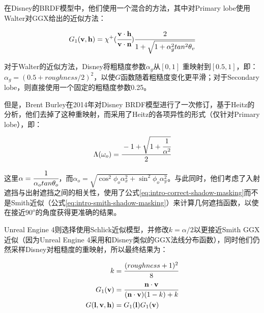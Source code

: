 在Disney的BRDF模型中，他们使用一个混合的方法，其中对Primary lobe使用Walter\cite{a:Microfacetmodelsforrefractionthroughroughsurfaces}对GGX给出的近似方法：

\begin{equation}
	G_1(\mathbf{v},\mathbf{h})=\chi^{+}( \cfrac{\mathbf{v}\cdot\mathbf{h}}{\mathbf{v}\cdot\mathbf{n}})   \cfrac{2}{1+\sqrt{1+\alpha^2_g tan^2 \theta_v}}
\end{equation}

\noindent 对于Walter的近似方法，Disney将粗糙度参数$\alpha_g$从$[0,1]$ 重映射到$[0.5,1]$，即：$\alpha_g=(0.5+roughness/2)^2$，以使$G$函数随着粗糙度变化更平滑；对于Secondary lobe，则直接使用一个固定的粗糙度参数0.25。

但是，Brent Burley在2014\cite{a:ExtendingtheDisneyBRDFtoaBSDFwithIntegratedSubsurfaceScattering}年对Disney BRDF模型进行了一次修订，基于Heitz\cite{a:UnderstandingtheMaskingShadowingFunctioninMicrofacetBasedBRDFs}的分析，他们去掉了这种重映射，而采用了Heitz的各项异性的形式（仅针对Primary lobe），即：

\begin{equation}
	\Lambda (\omega_o)= \cfrac{-1+\sqrt{1+ \cfrac{1}{\alpha^2}}}{2}
\end{equation}

\noindent 这里$\alpha= \cfrac{1}{\alpha_o tan \theta_o}$，而$\alpha_o=\sqrt{\cos^2 \phi_o \alpha^2_x + \sin^2\phi_o \alpha^2_y}$。与此同时，他们考虑了入射遮挡与出射遮挡之间的相关性，使用了公式\ref{eq:intro-correct-shadow-masking}而不是Smith近似（公式\ref{eq:intro-smith-shadow-masking}）来计算几何遮挡函数，以使在接近$90^o$的角度获得更准确的结果。

Unreal Engine 4\cite{a:RealShadinginUnrealEngine4}则选择使用Schlick\cite{a:AnInexpensiveBRDFModelforPhysically-BasedRendering}近似模型，并修改$k=\alpha /2$以更接近Smith GGX近似（因为Unreal Engine 4采用和Disney类似的GGX法线分布函数），同时他们仍然采样Disney对粗糙度的重映射，所以最终结果为：

\begin{equation}
	\begin{aligned}
		k&= \cfrac{(roughness+1)^2}{8}\\
		G_1(\mathbf{v})&= \cfrac{\mathbf{n}\cdot\mathbf{v}}{(\mathbf{n}\cdot\mathbf{v})(1-k)+k}\\
		G(\mathbf{l},\mathbf{v},\mathbf{h})&=G_1(\mathbf{l})G_1(\mathbf{v})
	\end{aligned}
\end{equation}






